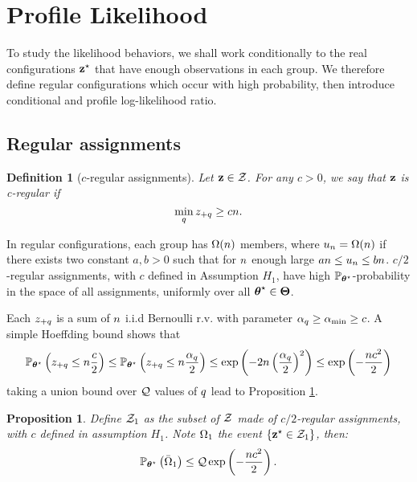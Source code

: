 \documentclass[]{imsart}
\newcommand{\1}{\mathds{1}}
\numberwithin{equation}{section}
\theoremstyle{plain}
\newtheorem{dof}[thm]{Definition}
\newtheorem{proposition}[thm]{Proposition}
\theoremstyle{remark}
\begin{document}
\section{Profile Likelihood}
\label{sec:profile-likelihood}
To study the likelihood behaviors, we shall work conditionally to the real configurations $\mathbf{z}^\star$ that have enough observations in each group. We therefore define regular configurations which occur with high probability, then introduce conditional and profile log-likelihood ratio. 
\subsection{Regular assignments}
\begin{dof}[$c$-regular assignments]
  \label{def:regular}
  Let $\mathbf{z} \in \mathcal{Z}$. For any $c > 0$, we say that $\mathbf{z}$ is c-\emph{regular} if
  \begin{equation}
    \label{eq:regular-configuration}
    \min_{\kk} \zsumk \geq {c\n} .
  \end{equation}
\end{dof}



In regular configurations, each group  has $\Omega(n)$ members, where $u_n=\Omega(n)$ if there exists two constant $a, b>0$ such that for $n$ enough large $an \leq u_n \leq bn$. $c/2$-regular assignments, with $c$ defined in Assumption $H_1$, have high  $\mathbb{P}_{\boldsymbol{\theta}^\star}$-probability in the space of all assignments, uniformly over all $\boldsymbol{\theta}^\star \in \boldsymbol{\Theta}$. 

Each $z_{+q}$ is a sum of $n$ i.i.d Bernoulli r.v. with parameter $\alpha_q \geq \alpha_{\min} \geq c$. A simple Hoeffding bound shows that
\begin{equation*}
  \Prob_{\bthetas}\left( \zsumk \leq \n \frac{c}{2} \right)
  \leq
  \Prob_{\bthetas}\left( \zsumk \leq \n \frac{\pik}{2} \right)
  \leq
  \exp\left( - 2\n\left(\frac{\pik}{2}\right)^2 \right)
  \leq
  \exp\left( - \frac{\n c^2}{2} \right)
\end{equation*}
taking a union bound over $\mathcal{Q}$ values of $q$ lead to Proposition \ref{cor:prob-regular-configurations-star}.
\begin{proposition}
  \label{cor:prob-regular-configurations-star}
  Define $\mathcal{Z}_1$ as the subset of $\mathcal{Z}$ made of $c/2$-regular assignments, with $c$ defined in assumption $H_1$. Note $\Omega_1$ the event $\{ \mathbf{z}^\star
  \in \mathcal{Z}_1 \}$, then:
  \begin{equation*}
    \Prob_{\bthetas}\left( \bar{\Om}_1 \right) \leq \q \exp\left( -\frac{\n c^2}{2}\right).
  \end{equation*}
\end{proposition}
\end{document}
